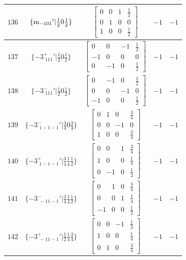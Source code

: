 \documentclass[fleqn,8pt]{jsarticle}
\begin{document}
\begin{longtable}{ccccc}
$ 136 $ & $ \{{\rm m}_{-101}{}'|\frac{1}{2} 0 \frac{1}{2}\} $ & $ \begin{bmatrix} 0 & 0 & 1 & \frac{1}{2} \\ 0 & 1 & 0 & 0 \\ 1 & 0 & 0 & \frac{1}{2} \end{bmatrix} $ & $ -1 $ & $ -1 $ \\ \hline
$ 137 $ & $ \{-3^{+}_{\,\,111}{}'|\frac{1}{2} 0 \frac{1}{2}\} $ & $ \begin{bmatrix} 0 & 0 & -1 & \frac{1}{2} \\ -1 & 0 & 0 & 0 \\ 0 & -1 & 0 & \frac{1}{2} \end{bmatrix} $ & $ -1 $ & $ -1 $ \\ \hline
$ 138 $ & $ \{-3^{-}_{\,\,111}{}'|\frac{1}{2} 0 \frac{1}{2}\} $ & $ \begin{bmatrix} 0 & -1 & 0 & \frac{1}{2} \\ 0 & 0 & -1 & 0 \\ -1 & 0 & 0 & \frac{1}{2} \end{bmatrix} $ & $ -1 $ & $ -1 $ \\ \hline
$ 139 $ & $ \{-3^{-}_{\,\,1-1-1}{}'|\frac{3}{4} 0 \frac{3}{4}\} $ & $ \begin{bmatrix} 0 & 1 & 0 & \frac{3}{4} \\ 0 & 0 & -1 & 0 \\ 1 & 0 & 0 & \frac{3}{4} \end{bmatrix} $ & $ -1 $ & $ -1 $ \\ \hline
$ 140 $ & $ \{-3^{+}_{\,\,1-1-1}{}'|\frac{3}{4} \frac{1}{4} \frac{1}{2}\} $ & $ \begin{bmatrix} 0 & 0 & 1 & \frac{3}{4} \\ 1 & 0 & 0 & \frac{1}{4} \\ 0 & -1 & 0 & \frac{1}{2} \end{bmatrix} $ & $ -1 $ & $ -1 $ \\ \hline
$ 141 $ & $ \{-3^{-}_{\,\,-11-1}{}'|\frac{3}{4} \frac{1}{4} \frac{1}{2}\} $ & $ \begin{bmatrix} 0 & 1 & 0 & \frac{3}{4} \\ 0 & 0 & 1 & \frac{1}{4} \\ -1 & 0 & 0 & \frac{1}{2} \end{bmatrix} $ & $ -1 $ & $ -1 $ \\ \hline
$ 142 $ & $ \{-3^{+}_{\,\,-11-1}{}'|\frac{1}{2} \frac{1}{4} \frac{3}{4}\} $ & $ \begin{bmatrix} 0 & 0 & -1 & \frac{1}{2} \\ 1 & 0 & 0 & \frac{1}{4} \\ 0 & 1 & 0 & \frac{3}{4} \end{bmatrix} $ & $ -1 $ & $ -1 $ \\ \hline

\end{longtable}
\end{document}
